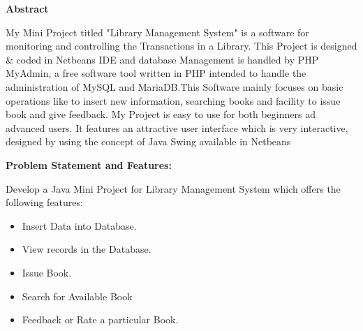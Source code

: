 \documentclass{article}
\begin{document}
\begin{center}
\textbf{Abstract}
\end{center}
\Large
\par 
My Mini Project titled "Library Management System" is a software for monitoring and controlling the Transactions in a Library. This Project is designed & coded in Netbeans IDE and database Management is handled by PHP MyAdmin, a free software tool written in PHP intended to handle the administration of MySQL and MariaDB.This Software mainly focuses on basic operations like to insert new information, searching books and facility to issue book and give feedback. My Project is easy to use for both beginners ad advanced users. It features an attractive user interface which is very interactive, designed by using the concept of Java Swing available in Netbeans\newline\newline
\begin{center}
\LARGE
\textbf{Problem Statement and Features:}\newline
\end{center}
\Large
Develop a Java Mini Project for Library Management System which offers the following features:\\

\begin{itemize}  
\item Insert Data into Database.
\item View records in the Database.
\item Issue Book.
\item Search for Available Book
\item Feedback or Rate a particular Book.
\end{itemize} 

\newpage
\end{document}
